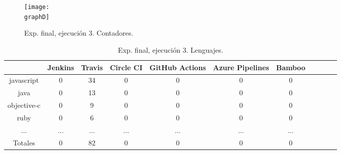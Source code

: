 \begin{figure}
  \centering
  \texttt{[image: \\graphD]}
  \caption{Exp. final, ejecución 3. Contadores.}
\end{figure}

\newpage

\begin{table}[h]
  \centering
  \caption{Exp. final, ejecución 3. Lenguajes.}
  \label{tab:tabla_f3_2a}

\begin{footnotesize}
\renewcommand{\arraystretch}{1.5} %
\begin{tabular}{ccccccccccc}
  \hline
  {} &  Jenkins &  Travis &  Circle CI &  GitHub Actions &  Azure Pipelines &  Bamboo \\
  \hline
  javascript   &        0 &      34 &          0 &               0 &                0 &       0 \\
  java         &        0 &      13 &          0 &               0 &                0 &       0 \\
  objective-c  &        0 &       9 &          0 &               0 &                0 &       0 \\
  ruby         &        0 &       6 &          0 &               0 &                0 &       0 \\
  ...          &      ... &     ... &        ... &             ... &              ... &     ... \\
  \hline
  Totales      &        0 &      82 &          0 &               0 &                0 &       0 \\
 \end{tabular}
\end{footnotesize}

\end{table}

